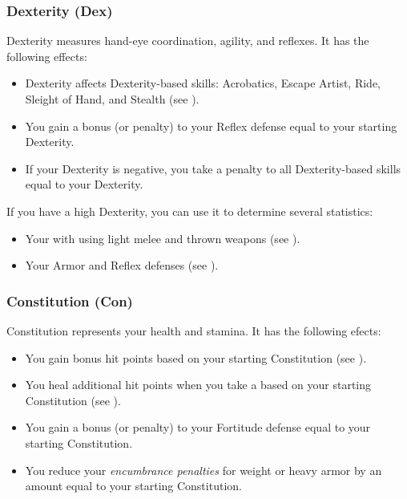         \subsubsection{Dexterity (Dex)}\label{Dexterity}
            Dexterity measures hand-eye coordination, agility, and reflexes.
            It has the following effects:
            \begin{itemize}
                \item Dexterity affects Dexterity-based skills: Acrobatics, Escape Artist, Ride, Sleight of Hand, and Stealth (see ).
                \item You gain a bonus (or penalty) to your Reflex defense equal to your starting Dexterity.
                \item If your Dexterity is negative, you take a penalty to all Dexterity-based skills equal to your Dexterity.
            \end{itemize}

            If you have a high Dexterity, you can use it to determine several statistics:
            \begin{itemize}
                \item Your  with  using light melee and thrown weapons (see ).
                \item Your Armor and Reflex defenses (see ).
            \end{itemize}

        \subsubsection{Constitution (Con)}\label{Constitution}
            Constitution represents your health and stamina.
            It has the following efects:
            \begin{itemize}
                \item You gain bonus hit points based on your starting Constitution (see ).
                \item You heal additional hit points when you take a  based on your starting Constitution (see ).
                \item You gain a bonus (or penalty) to your Fortitude defense equal to your starting Constitution.
                \item You reduce your \textit{encumbrance penalties} for weight or heavy armor by an amount equal to your starting Constitution.
            \end{itemize}

